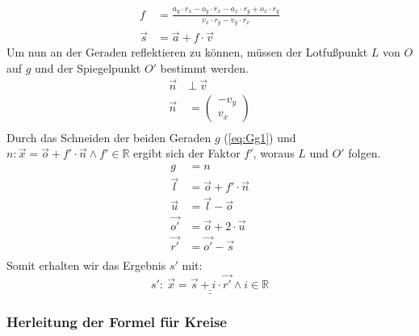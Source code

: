 \documentclass[reducespace,stylepage,semiarbeit]{spezidoc}
\begin{document}
\begin{equation*}
\begin{split}
f &= \frac{a_y \cdot r_x - o_y \cdot r_x - a_x \cdot r_y + o_x \cdot r_y}{v_x \cdot r_y - v_y \cdot r_x} \\
\vec{s} &= \vec{a} + f \cdot \vec{v}
\end{split}
\end{equation*}
Um nun an der Geraden reflektieren zu können, müssen der Lotfußpunkt $L$ von $O$ auf $g$  und der Spiegelpunkt $O'$ bestimmt werden.
\begin{equation*}
\begin{split}
\vec{n}~ &\bot ~\vec{v} \\
\vec{n} &= \begin{pmatrix} -v_y \\ v_x \end{pmatrix} \\
\end{split}
\end{equation*}
Durch das Schneiden der beiden Geraden $g$ (\ref{eq:Gg1}) und $n: \vec{x} = \vec{o} + f' \cdot \vec{n} \wedge f' \in \mathds{R}$ ergibt sich der Faktor $f'$, woraus $L$ und $O'$ folgen.
\begin{equation*}
\begin{split}
g &= n \\
\vec{l} &= \vec{o} + f' \cdot \vec{n} \\
\vec{u} &= \vec{l} - \vec{o} \\
\vec{o'} &= \vec{o} + 2 \cdot \vec{u} \\
\vec{r'} &= \vec{o'} - \vec{s} \\
\end{split}
\end{equation*}
Somit erhalten wir das Ergebnis $s'$ mit:
\begin{equation*}
\underline{\underline{s':~ \vec{x} = \vec{s} + i \cdot \vec{r'} \wedge i \in \mathds{R}}}
\end{equation*}

\newpage
\subsubsection*{Herleitung der Formel für Kreise}
\end{document}
